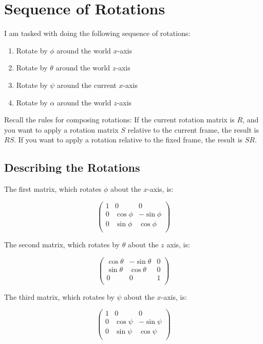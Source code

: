 \documentclass{article}
\begin{document}
\section{Sequence of Rotations}

I am tasked with doing the following sequence of rotations:

\begin{enumerate}
\item Rotate by $\phi$ around the world $x$-axis
\item Rotate by $\theta$ around the world $z$-axis
\item Rotate by $\psi$ around the current $x$-axis
\item Rotate by $\alpha$ around the world $z$-axis
\end{enumerate}

Recall the rules for composing rotations:
If the current rotation matrix is $R$, and you want to apply
	a rotation matrix $S$ relative to the current frame, the result
	is $R S$.
If you want to apply a rotation relative to the fixed frame,
	the result is $S R$.

\subsection{Describing the Rotations}

The first matrix, which rotates $\phi$ about the $x$-axis, is:

\[ \left( 
	\begin{matrix}
		1 & 0 & 0 \\
		0 & \cos \phi & - \sin \phi \\
		0 & \sin \phi & \cos \phi \\
	\end{matrix} \right) \]

The second matrix, which rotates by $\theta$ about the $z$ axis, is:

\[ \left(
	\begin{matrix}
		\cos \theta & - \sin \theta & 0 \\
		\sin \theta & \cos \theta & 0 \\
		0 & 0 & 1 \\	
	\end{matrix}
	\right) \]

The third matrix, which rotates by $\psi$ about the $x$-axis, is:

\[ \left( 
	\begin{matrix}
		1 & 0 & 0 \\
		0 & \cos \psi & -\sin \psi  \\
		0 & \sin \psi & \cos \psi \\
	\end{matrix} \right) \]
\end{document}
